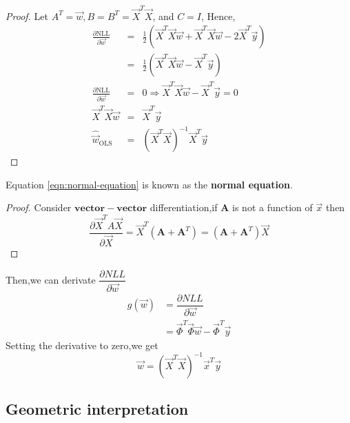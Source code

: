 \begin{proof}
Let $A^T=\vec{w}, B=B^T=\vec{X}^T\vec{X}$, and $C=I$, Hence,
\begin{eqnarray}
\frac{\partial \text{NLL}}{\partial\vec{w}} &=& \frac{1}{2} (\vec{X}^T\vec{X}\vec{w}+\vec{X}^T\vec{X}\vec{w} -2\vec{X}^T\vec{y}) \nonumber \\
						   &=& \frac{1}{2} (\vec{X}^T\vec{X}\vec{w} - \vec{X}^T\vec{y}) \nonumber \\
\frac{\partial \text{NLL}}{\partial\vec{w}} &=& 0 \Rightarrow \vec{X}^T\vec{X}\vec{w} - \vec{X}^T\vec{y} =0 \nonumber \\
\vec{X}^T\vec{X}\vec{w} &=& \vec{X}^T\vec{y} \label{eqn:normal-equation} \\
\hat{\vec{w}}_{\mathrm{OLS}} &=& (\vec{X}^T\vec{X})^{-1}\vec{X}^T\vec{y} \nonumber
\end{eqnarray}
\end{proof}
Equation \ref{eqn:normal-equation} is known as the \textbf{normal equation}.
\begin{proof}
Consider $\mathbf{vector-vector}$ differentiation,if $\mathbf{A}$ is not a function of $\vec{x}$ then
\begin{equation}
\dfrac{\partial\vec{X}^TA\vec{X}}{\partial\vec{X}} = \vec{X}^T(\mathbf{A}+\mathbf{A}^T) = (\mathbf{A}+\mathbf{A}^T)\vec{X}
\end{equation}
\end{proof}
Then,we can derivate $\dfrac{\partial NLL}{\partial \vec{w}}$
\begin{eqnarray}
g(\vec{w}) &= \dfrac{\partial NLL}{\partial\vec{w}} \\
&=\vec{\Phi}^T\vec{\Phi}\vec{w} - \vec{\Phi}^T\vec{y}			
\end{eqnarray}
Setting the derivative to zero,we get
\begin{equation}
	\vec{w} = (\vec{X}^T\vec{X})^{-1}\vec{x}^T\vec{y}
\end{equation}

\subsection{Geometric interpretation}

